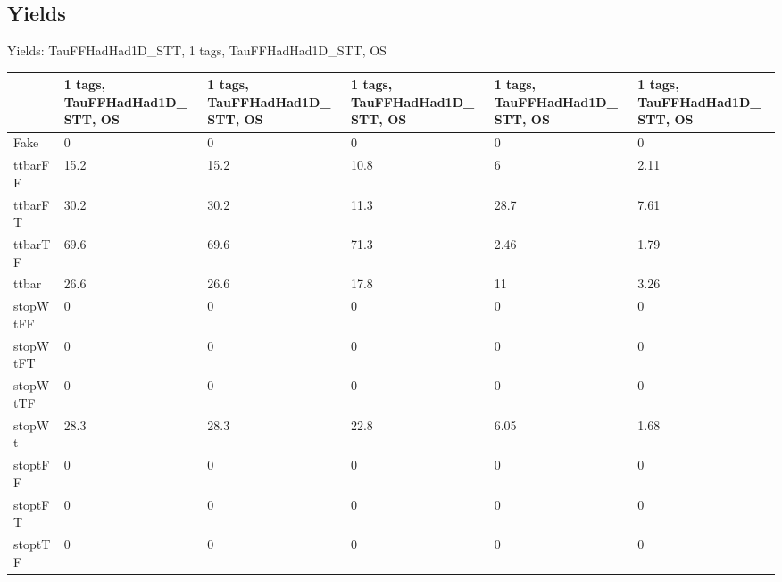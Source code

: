 
\subsection{Yields}

\begin{frame}{Yields: TauFFHadHad1D\_STT, 1 tags, TauFFHadHad1D\_STT, OS}
\begin{center}
  \begin{tabular}{l| >{\centering\let\newline\\\arraybackslash\hspace{0pt}}m{1.4cm}| >{\centering\let\newline\\\arraybackslash\hspace{0pt}}m{1.4cm}| >{\centering\let\newline\\\arraybackslash\hspace{0pt}}m{1.4cm}| >{\centering\let\newline\\\arraybackslash\hspace{0pt}}m{1.4cm}| >{\centering\let\newline\\\arraybackslash\hspace{0pt}}m{1.4cm}}
    & 1 tags, TauFFHadHad1D\_STT, OS & 1 tags, TauFFHadHad1D\_STT, OS & 1 tags, TauFFHadHad1D\_STT, OS & 1 tags, TauFFHadHad1D\_STT, OS & 1 tags, TauFFHadHad1D\_STT, OS \\
 \hline \hline
    Fake& 0 & 0 & 0 & 0 & 0 \\
 \hline
    ttbarFF& 15.2 & 15.2 & 10.8 & 6 & 2.11 \\
 \hline
    ttbarFT& 30.2 & 30.2 & 11.3 & 28.7 & 7.61 \\
 \hline
    ttbarTF& 69.6 & 69.6 & 71.3 & 2.46 & 1.79 \\
 \hline
    ttbar& 26.6 & 26.6 & 17.8 & 11 & 3.26 \\
 \hline
    stopWtFF& 0 & 0 & 0 & 0 & 0 \\
 \hline
    stopWtFT& 0 & 0 & 0 & 0 & 0 \\
 \hline
    stopWtTF& 0 & 0 & 0 & 0 & 0 \\
 \hline
    stopWt& 28.3 & 28.3 & 22.8 & 6.05 & 1.68 \\
 \hline
    stoptFF& 0 & 0 & 0 & 0 & 0 \\
 \hline
    stoptFT& 0 & 0 & 0 & 0 & 0 \\
 \hline
    stoptTF& 0 & 0 & 0 & 0 & 0 \\

\end{tabular}
\end{center}
\end{frame}
